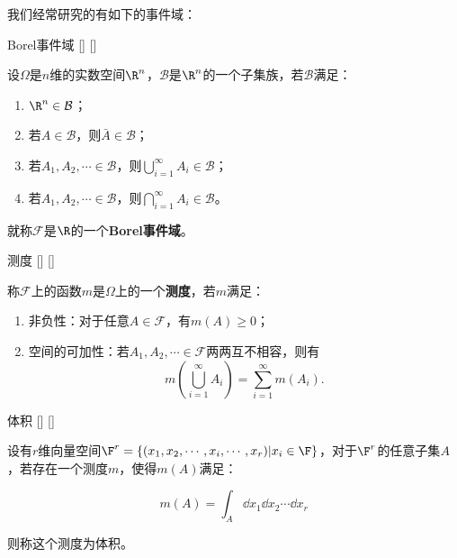\documentclass[UTF8]{ctexart}
\begin{document}
        我们经常研究的有如下的事件域：

        \begin{dfn}
            []
            {Borel事件域}
            []
            []


            设$\Omega$是$n$维的实数空间$\R^n$，$\mathcal{B}$是$\R^n$的一个子集族，若$\mathcal{B}$满足：

            \begin{enumerate}
                \item $\R^n\in\mathcal{B}$；
                \item 若$A\in\mathcal{B}$，则$\bar{A}\in\mathcal{B}$；
                \item 若$A_1,A_2,\cdots\in\mathcal{B}$，则$\bigcup_{i=1}^{\infty}A_i\in\mathcal{B}$；
                \item 若$A_1,A_2,\cdots\in\mathcal{B}$，则$\bigcap_{i=1}^{\infty}A_i\in\mathcal{B}$。
            \end{enumerate}
            就称$\mathcal{F}$是$\R$的一个\textbf{Borel事件域}。
        \end{dfn}

        \begin{dfn}
            []
            {测度}
            []
            []

            
            称$\mathcal{F}$上的函数$m$是$\Omega$上的一个\textbf{测度}，若$m$满足：

            \begin{enumerate}
                \item 非负性：对于任意$A\in\mathcal{F}$，有$m(A)\geq 0$；
                \item 空间的可加性：若$A_1,A_2,\cdots\in\mathcal{F}$两两互不相容，则有\[m\left(\bigcup_{i=1}^{\infty}A_i\right)=\sum_{i=1}^{\infty}m(A_i).\]
            \end{enumerate}
        \end{dfn}

        \begin{dfn}
            []
            {体积}
            []
            []


            设有$r$维向量空间$\F^r=\left\{(x_1,x_2,\cdots,x_i,\cdots,x_r)|x_i\in\F\right\} $，对于$\F^r$的任意子集$A$，若存在一个测度$m$，使得$m(A)$满足：

            \[m(A)=\int_{A}\dd x_1\dd x_2\cdots\dd x_r\]

            则称这个测度为体积。
        \end{dfn}
\end{document}
